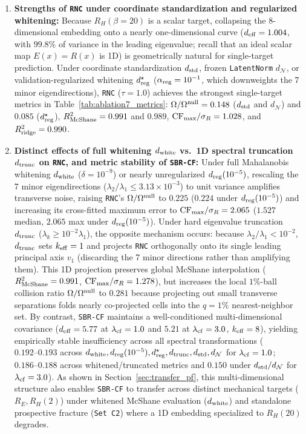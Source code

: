 \documentclass[preprint,11pt,a4paper]{elsarticle}
\begin{document}
\begin{enumerate}
    \item \textbf{Strengths of \texttt{RNC} under coordinate standardization and regularized whitening:} Because $R_H(\beta=20)$ is a scalar target, collapsing the 8-dimensional embedding onto a nearly one-dimensional curve ($d_{\rm eff}=1.004$, with $99.8\%$ of variance in the leading eigenvalue; recall that an ideal scalar map $E(x)=R(x)$ is 1D) is geometrically natural for single-target prediction. Under coordinate standardization $d_{\rm std}$, frozen \texttt{LatentNorm} $d_{\mathcal N}$, or validation-regularized whitening $d_{\rm reg}^\star$ ($\alpha_{\rm reg}=10^{-1}$, which downweights the 7 minor eigendirections), \texttt{RNC} ($\tau=1.0$) achieves the strongest single-target metrics in Table~\ref{tab:ablation7_metrics}: $\Omega/\Omega^{\rm null}=0.148$ ($d_{\rm std}$ and $d_{\mathcal N}$) and $0.085$ ($d_{\rm reg}^\star$), $R^2_{\rm McShane}=0.991$ and $0.989$, ${\rm CF}_{\max}/\sigma_R=1.028$, and $R^2_{\rm ridge}=0.990$.
    \item \textbf{Distinct effects of full whitening $d_{\rm white}$ vs.\ 1D spectral truncation $d_{\rm trunc}$ on \texttt{RNC}, and metric stability of \texttt{SBR-CF}:} Under full Mahalanobis whitening $d_{\rm white}$ ($\delta=10^{-9}$) or nearly unregularized $d_{\rm reg}(10^{-5})$, rescaling the 7 minor eigendirections ($\lambda_2/\lambda_1\le 3.13\times 10^{-3}$) to unit variance amplifies transverse noise, raising \texttt{RNC}'s $\Omega/\Omega^{\rm null}$ to $0.225$ ($0.224$ under $d_{\rm reg}(10^{-5})$) and increasing its cross-fitted maximum error to ${\rm CF}_{\max}/\sigma_R=2.065$ ($1.527$ median, $2.065$ max under $d_{\rm reg}(10^{-5})$). Under hard eigenvalue truncation $d_{\rm trunc}$ ($\lambda_k\ge 10^{-2}\lambda_1$), the opposite mechanism occurs: because $\lambda_2/\lambda_1<10^{-2}$, $d_{\rm trunc}$ sets $k_{\rm eff}=1$ and projects \texttt{RNC} orthogonally onto its single leading principal axis $v_1$ (discarding the 7 minor directions rather than amplifying them). This 1D projection preserves global McShane interpolation ($R^2_{\rm McShane}=0.991$, ${\rm CF}_{\max}/\sigma_R=1.278$), but increases the local $1\%$-ball collision ratio $\Omega/\Omega^{\rm null}$ to $0.281$ because projecting out small transverse separations folds nearly co-projected cells into the $q=1\%$ nearest-neighbor set. By contrast, \texttt{SBR-CF} maintains a well-conditioned multi-dimensional covariance ($d_{\rm eff}=5.77$ at $\lambda_{\rm cf}=1.0$ and $5.21$ at $\lambda_{\rm cf}=3.0$, $k_{\rm eff}=8$), yielding empirically stable insufficiency across all spectral transformations ($0.192\text{--}0.193$ across $d_{\rm white}, d_{\rm reg}(10^{-5}), d_{\rm reg}^\star, d_{\rm trunc}, d_{\rm std}, d_{\mathcal N}$ for $\lambda_{\rm cf}=1.0$; $0.186\text{--}0.188$ across whitened/truncated metrics and $0.150$ under $d_{\rm std}/d_{\mathcal N}$ for $\lambda_{\rm cf}=3.0$). As shown in Section~\ref{sec:transfer_pf}, this multi-dimensional structure also enables \texttt{SBR-CF} to transfer across distinct mechanical targets ($R_E, R_H(2)$) under whitened McShane evaluation ($d_{\rm white}$) and standalone prospective fracture (\texttt{Set C2}) where a 1D embedding specialized to $R_H(20)$ degrades.

\end{enumerate}
\end{document}
